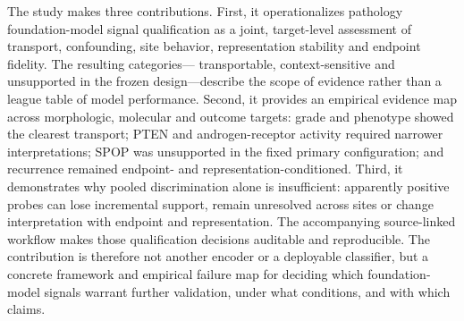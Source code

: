 The study makes three contributions. First, it operationalizes pathology foundation-model
signal qualification as a joint, target-level assessment of transport, confounding, site
behavior, representation stability and endpoint fidelity. The resulting categories---
transportable, context-sensitive and unsupported in the frozen design---describe the scope
of evidence rather than a league table of model performance. Second, it provides an
empirical evidence map across morphologic, molecular and outcome targets: grade and
phenotype showed the clearest transport; PTEN and androgen-receptor activity required
narrower interpretations; SPOP was unsupported in the fixed primary configuration; and
recurrence remained endpoint- and representation-conditioned. Third, it demonstrates why
pooled discrimination alone is insufficient: apparently positive probes can lose
incremental support, remain unresolved across sites or change interpretation with endpoint
and representation. The accompanying source-linked workflow makes those qualification
decisions auditable and reproducible. The contribution is therefore not another encoder or
a deployable classifier, but a concrete framework and empirical failure map for deciding
which foundation-model signals warrant further validation, under what conditions, and with
which claims.
